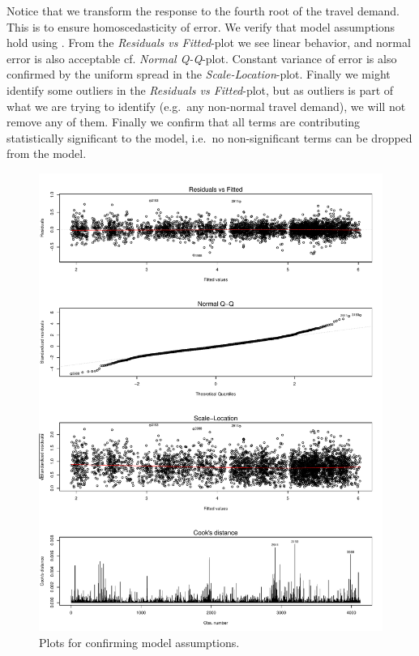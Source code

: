 Notice that we transform the response to the fourth root of the travel demand. This is to ensure homoscedasticity of error. We verify that model assumptions hold using . From the \emph{Residuals vs Fitted}-plot we see linear behavior, and normal error is also acceptable cf. \emph{Normal Q-Q}-plot. Constant variance of error is also confirmed by the uniform spread in the \emph{Scale-Location}-plot. Finally we might identify some outliers in the \emph{Residuals vs Fitted}-plot, but as outliers is part of what we are trying to identify (e.g.\ any non-normal travel demand), we will not remove any of them. Finally we confirm that all terms are contributing statistically significant to the model, i.e.\ no non-significant terms can be dropped from the model.

\begin{figure}[!p]
    \center
    \includegraphics[width=\textwidth]{../plots/fit-assumptions}    
    \caption{Plots for confirming model assumptions.}    
    \label{fit-assumptions}
\end{figure}

